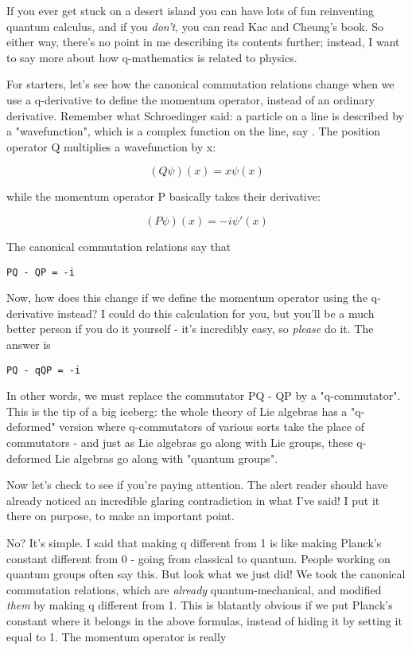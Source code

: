 If you ever get stuck on a desert island you can have lots of fun
reinventing quantum calculus, and if you \emph{don't}, you can read Kac 
and Cheung's book.  So either way, there's no point in me describing 
its contents further; instead, I want to say more about how q-mathematics
is related to physics.

For starters, let's see how the canonical commutation relations
change when we use a q-derivative to define the momentum operator,
instead of an ordinary derivative.  Remember what Schroedinger said:
a particle on a line is described by a "wavefunction", which is a 
complex function on the line, say \psi .  The position operator Q 
multiplies a wavefunction by x:

$$
(Q \psi )(x) = x \psi (x)
$$
    
while the momentum operator P basically takes their derivative:

$$
(P \psi )(x) = -i \psi '(x)
$$
    
The canonical commutation relations say that

\begin{verbatim}
PQ - QP = -i
\end{verbatim}
    
Now, how does this change if we define the momentum operator using the
q-derivative instead?  I could do this calculation for you, but you'll
be a much better person if you do it yourself - it's incredibly easy, 
so \emph{please} do it.  The answer is

\begin{verbatim}
PQ - qQP = -i
\end{verbatim}
    

In other words, we must replace the commutator PQ - QP by a
"q-commutator".  This is the tip of a big iceberg: the whole
theory of Lie algebras has a "q-deformed" version where
q-commutators of various sorts take the place of commutators - and just
as Lie algebras go along with Lie groups, these q-deformed Lie algebras
go along with "quantum groups".

Now let's check to see if you're paying attention.  The alert reader
should have already noticed an incredible glaring contradiction in what
I've said!  I put it there on purpose, to make an important point.

No?  It's simple.  I said that making q different from 1 is like making
Planck's constant different from 0 - going from classical to quantum. 
People working on quantum groups often say this.  But look what we just
did!  We took the canonical commutation relations, which are \emph{already}
quantum-mechanical, and modified \emph{them} by making q different from 1. 
This is blatantly obvious if we put Planck's constant where it belongs
in the above formulas, instead of hiding it by setting it equal to 1. 
The momentum operator is really

